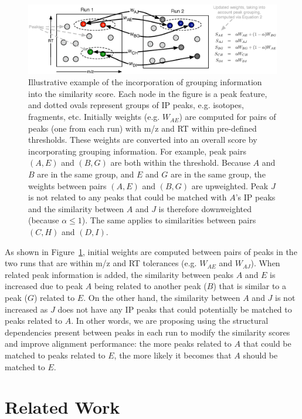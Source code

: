 \begin{figure}[!htbp]
\centering\includegraphics[width=1\linewidth]{04-matching/figures/figure_1.eps}
\centering\caption{\label{fig:computingweight} Illustrative example of the incorporation of grouping information into the similarity score. Each node in the figure is a peak feature, and dotted ovals represent groups of IP peaks, e.g. isotopes, fragments, etc. Initially weights (e.g. $W_{AE}$) are computed for pairs of peaks (one from each run) with m/z and RT within pre-defined thresholds. These weights are converted into an overall score by incorporating grouping information. For example, peak pairs $(A,E)$ and $(B,G)$ are both within the threshold. Because $A$ and $B$ are in the same group, and $E$ and $G$ are in the same group, the weights between pairs $(A,E)$ and $(B,G)$ are upweighted. Peak $J$ is not related to any peaks that could be matched with $A$'s IP peaks and the similarity between $A$ and $J$ is therefore downweighted (because $\alpha\leq 1$). The same applies to similarities between pairs $(C,H)$ and $(D,I)$.}
\end{figure}

As shown in Figure~\ref{fig:computingweight}, initial weights are computed between pairs of peaks in the two runs that are within m/z and RT tolerances (e.g. $W_{AE}$ and $W_{AJ}$). When related peak information is added, the similarity between peaks $A$ and $E$ is increased due to peak $A$ being related to another peak ($B$) that is similar to a peak ($G$) related to $E$. On the other hand, the similarity between $A$ and $J$ is not increased as $J$ does not have any IP peaks that could potentially be matched to peaks related to $A$. In other words, we are proposing using the structural dependencies present between peaks in each run to modify the similarity scores and improve alignment performance: the more peaks related to $A$ that could be matched to peaks related to $E$, the more likely it becomes that $A$ should be matched to $E$.

\section{Related Work}

